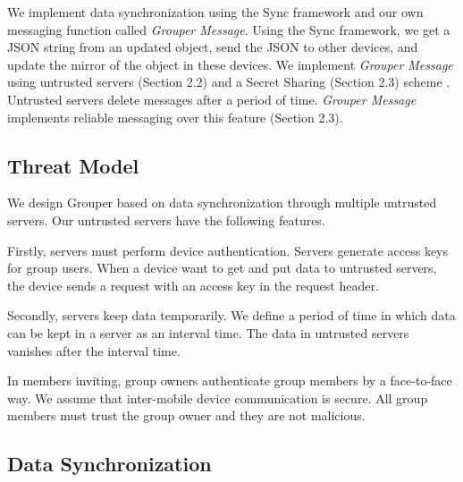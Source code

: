 \documentclass[twocolumn,10pt]{article}
\begin{document}
We implement data synchronization using the Sync framework\cite{sync} and our own messaging function called \emph{Grouper Message}.
Using the Sync framework, we get a JSON string from an updated object, send the JSON to other devices, and update the mirror of the object in these devices. 
We implement \emph{Grouper Message} using untrusted servers (Section 2.2) and a Secret Sharing (Section 2.3) scheme . 
Untrusted servers delete messages after a period of time. 
\emph{Grouper Message} implements reliable messaging over this feature (Section 2.3).

\subsection{Threat Model}

We design Grouper based on data synchronization through multiple untrusted servers. Our untrusted servers have the following features.

Firstly, servers must perform device authentication. 
Servers generate access keys for group users. 
When a device want to get and put data to untrusted servers, the device sends a request with an access key in the request header.

Secondly, servers keep data temporarily.
We define a period of time in which data can be kept in a server as an interval time. 
The data in untrusted servers vanishes after the interval time.

In members inviting, group owners authenticate group members by a face-to-face way. We assume that inter-mobile device communication is secure. All group members must trust the group owner and they are not malicious.

\subsection{Data Synchronization}
\end{document}

